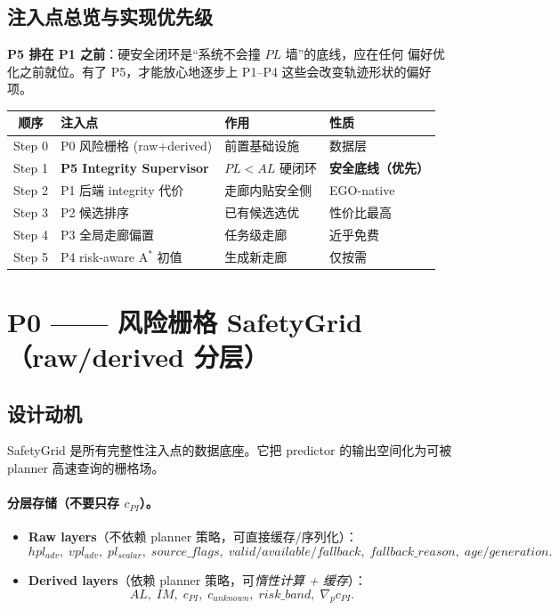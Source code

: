 \documentclass[11pt]{ctexart}
\begin{document}
\subsection{注入点总览与实现优先级}
\textbf{P5 排在 P1 之前}：硬安全闭环是``系统不会撞 $PL$ 墙''的底线，应在任何
偏好优化之前就位。有了 P5，才能放心地逐步上 P1--P4 这些会改变轨迹形状的偏好项。

\begin{center}\renewcommand{\arraystretch}{1.3}
\begin{tabular}{@{}clll@{}}
\toprule
顺序 & 注入点 & 作用 & 性质\\
\midrule
Step 0 & P0 风险栅格 (raw+derived) & 前置基础设施 & 数据层\\
Step 1 & \textbf{P5 Integrity Supervisor} & $PL<AL$ 硬闭环 & \textbf{安全底线（优先）}\\
Step 2 & P1 后端 integrity 代价 & 走廊内贴安全侧 & EGO-native\\
Step 3 & P2 候选排序 & 已有候选选优 & 性价比最高\\
Step 4 & P3 全局走廊偏置 & 任务级走廊 & 近乎免费\\
Step 5 & P4 risk-aware A$^\ast$ 初值 & 生成新走廊 & 仅按需\\
\bottomrule
\end{tabular}\end{center}

\section{P0 —— 风险栅格 SafetyGrid（raw/derived 分层）}

\subsection{设计动机}
SafetyGrid 是所有完整性注入点的数据底座。它把 predictor 的输出空间化为可被
planner 高速查询的栅格场。

\paragraph{分层存储（不要只存 $c_{PI}$）。}
\begin{itemize}
\item \textbf{Raw layers}（不依赖 planner 策略，可直接缓存/序列化）：
  \[
  hpl_{adv},\; vpl_{adv},\; pl_{scalar},\; source\_flags,\;
  valid/available/fallback,\; fallback\_reason,\; age/generation .
  \]
\item \textbf{Derived layers}（依赖 planner 策略，可\emph{惰性计算 + 缓存}）：
  \[
  AL,\; IM,\; c_{PI},\; c_{unknown},\; risk\_band,\; \nabla_p c_{PI} .
  \]
\end{itemize}
\end{document}
